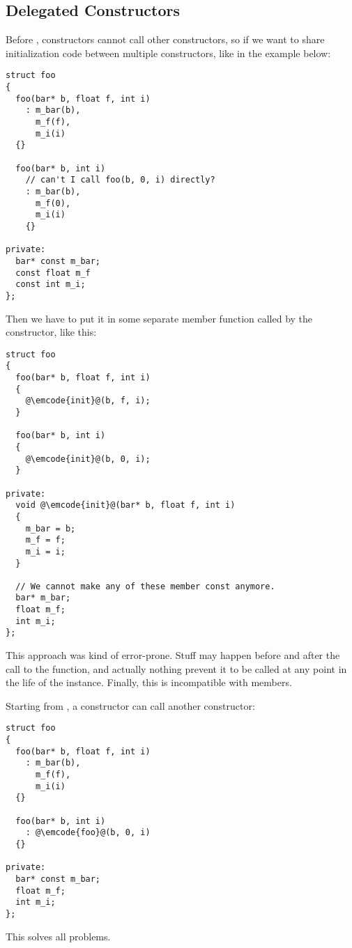 \subsection{Delegated Constructors}

Before , constructors cannot call other constructors, so if we
want to share initialization code between multiple constructors, like
in the example below:

\begin{lstlisting}
struct foo
{
  foo(bar* b, float f, int i)
    : m_bar(b),
      m_f(f),
      m_i(i)
  {}

  foo(bar* b, int i)
    // can't I call foo(b, 0, i) directly?
    : m_bar(b),
      m_f(0),
      m_i(i)
    {}

private:
  bar* const m_bar;
  const float m_f
  const int m_i;
};
\end{lstlisting}

Then we have to put it in some separate member function called by the
constructor, like this:

\begin{lstlisting}
struct foo
{
  foo(bar* b, float f, int i)
  {
    @\emcode{init}@(b, f, i);
  }

  foo(bar* b, int i)
  {
    @\emcode{init}@(b, 0, i);
  }

private:
  void @\emcode{init}@(bar* b, float f, int i)
  {
    m_bar = b;
    m_f = f;
    m_i = i;
  }

  // We cannot make any of these member const anymore.
  bar* m_bar;
  float m_f;
  int m_i;
};
\end{lstlisting}

This approach was kind of error-prone. Stuff may happen before and
after the call to the  function, and actually nothing
prevent it to be called at any point in the life of the
instance. Finally, this is incompatible with  members.

Starting from , a constructor can call another constructor:

\begin{lstlisting}
struct foo
{
  foo(bar* b, float f, int i)
    : m_bar(b),
      m_f(f),
      m_i(i)
  {}

  foo(bar* b, int i)
    : @\emcode{foo}@(b, 0, i)
  {}

private:
  bar* const m_bar;
  float m_f;
  int m_i;
};
\end{lstlisting}

This solves all problems.
